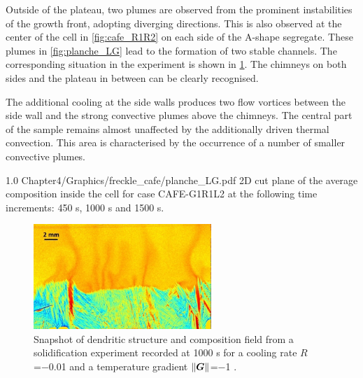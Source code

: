 Outside of the plateau, two plumes are observed from the prominent instabilities of the growth front, adopting diverging directions. 
This is also observed at the center of the cell in \cref{fig:cafe_R1R2} on each side of the A-shape segregate. 
These plumes in \cref{fig:planche_LG} lead to the formation of two stable channels. 
The corresponding situation in the experiment is shown in \cref{fig:exp_G1R1}. The chimneys on both sides and the plateau in between can be clearly 
recognised. 

The additional cooling at the side walls produces two flow vortices between the side wall and the strong convective plumes above the 
chimneys. The central part of the sample remains almost unaffected by the additionally driven thermal convection. This area is characterised by 
the occurrence of a number of smaller convective plumes.  

\begin{figureth}
{1.0}
{Chapter4/Graphics/freckle_cafe/planche_LG.pdf}
{2D cut plane of the average composition inside the cell for case CAFE-G1R1L2 at the 
following time increments: 450 s, 1000 s and 1500 s.}
\label{fig:planche_LG}
\end{figureth}

\begin{figure}[htbp]
\centering
\includegraphics[width=0.6\textwidth]{Chapter4/Graphics/freckle_exp/exp_G1R1.png}
\captionsetup{singlelinecheck=off}
\caption[.]{Snapshot of dendritic structure and composition field from a 
solidification experiment recorded at 1000 s for a cooling rate $R$=\SI{-0.01}{\uCR} 
and a temperature gradient $\lVert \boldsymbol{G} \rVert$=\SI{-1}{\ugradT} \citep{shevchenko_chimney_2013}.}
\label{fig:exp_G1R1}
\end{figure}






